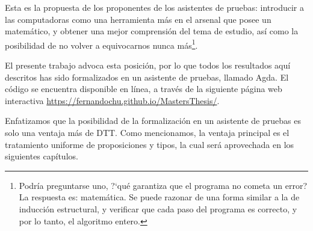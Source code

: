 \documentclass[../main.tex]{subfiles}
\begin{document}
Esta es la propuesta de los proponentes de los asistentes de pruebas: introducir a las computadoras como una herramienta m\'as en el arsenal que posee un matem\'atico, y obtener una mejor comprensi\'on del tema de estudio, as\'i como la posibilidad de no volver a equivocarnos nunca m\'as\footnote{Podr\'ia preguntarse uno, ?`qu\'e garantiza que el programa no cometa un error? La respuesta es: matemática. Se puede razonar de una forma similar a la de inducción estructural, y verificar que cada paso del programa es correcto, y por lo tanto, el algoritmo entero.}.

El presente trabajo advoca esta posici\'on, por lo que todos los resultados aqu\'i descritos has sido formalizados en un asistente de pruebas, llamado Agda.
El c\'odigo se encuentra disponible en l\'inea, a trav\'es de la siguiente p\'agina web interactiva \url{https://fernandochu.github.io/MastersThesis/}.

Enfatizamos que la posibilidad de la formalizaci\'on en un asistente de pruebas es solo una ventaja m\'as de DTT.
Como mencionamos, la ventaja principal es el tratamiento uniforme de proposiciones y tipos, la cual ser\'a aprovechada en los siguientes cap\'itulos.
\end{document}
